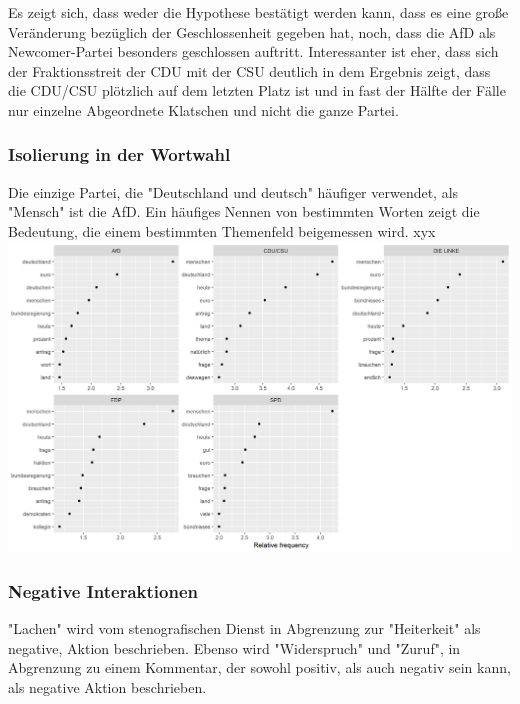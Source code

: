 Es zeigt sich, dass weder die Hypothese bestätigt werden kann, dass es eine große Veränderung bezüglich der Geschlossenheit gegeben hat, noch, dass die AfD als Newcomer-Partei besonders geschlossen auftritt. Interessanter ist eher, dass sich der Fraktionsstreit der CDU mit der CSU deutlich in dem Ergebnis zeigt, dass die CDU/CSU plötzlich auf dem letzten Platz ist und in fast der Hälfte der Fälle nur einzelne Abgeordnete Klatschen und nicht die ganze Partei. 

\subsubsection{Isolierung in der Wortwahl} 
Die einzige Partei, die "Deutschland und deutsch" häufiger verwendet, als "Mensch" ist die AfD. Ein häufiges Nennen von bestimmten Worten zeigt die Bedeutung, die einem bestimmten Themenfeld beigemessen wird. xyx \\

\includegraphics[width=\linewidth]{Grafiken/17_HäufigsteWörter.png}\\

\subsubsection{Negative Interaktionen}

"Lachen" wird vom stenografischen Dienst in Abgrenzung zur "Heiterkeit" als negative, Aktion beschrieben. Ebenso wird "Widerspruch" und "Zuruf", in Abgrenzung zu einem Kommentar, der sowohl positiv, als auch negativ sein kann, als negative Aktion beschrieben. 

